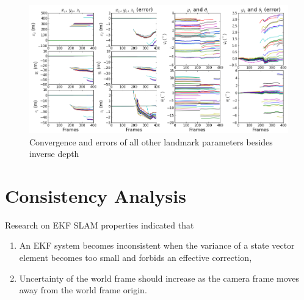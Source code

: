 \begin{figure}[h]
\centering
\includegraphics[width=14cm, keepaspectratio=true]
{./Figures/fltfig/cut1/Figure20.png}
\caption{Convergence and errors of all other landmark parameters
  besides inverse depth}
\label{fltfig:2}
\end{figure}
\FloatBarrier

\section{Consistency Analysis}\label{sec:flight-consistency}
Research on EKF SLAM properties indicated that 
\begin{enumerate}
  \item An EKF system becomes inconsistent when the variance of a state
  vector element becomes too small and forbids an effective correction,
  \item Uncertainty of the world frame should increase as the
  camera frame moves away from the world frame origin.
\end{enumerate}

